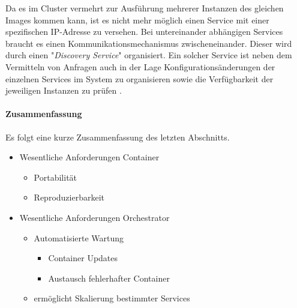 Da es im Cluster vermehrt zur Ausführung mehrerer Instanzen des gleichen Images kommen kann, ist es nicht mehr möglich einen Service mit einer spezifischen IP-Adresse zu versehen. Bei untereinander abhängigen Services braucht es einen Kommunikationsmechanismus zwischeneinander. Dieser wird durch einen "\emph{Discovery Service}" organisiert. Ein solcher Service ist neben dem Vermitteln von Anfragen auch in der Lage Konfigurationsänderungen der einzelnen Services im System zu organisieren sowie die Verfügbarkeit der jeweiligen Instanzen zu prüfen \cite[Seite~45 ff.]{soppelsaswarm}.

\paragraph{Zusammenfassung}

Es folgt eine kurze Zusammenfassung des letzten Abschnitts.

\begin{itemize}
  \item Wesentliche Anforderungen Container
  \begin{itemize}
    \item Portabilität
    \item Reproduzierbarkeit
  \end{itemize}
  \item Wesentliche Anforderungen Orchestrator
  \begin{itemize}
    \item Automatisierte Wartung 
    \begin{itemize}
      \item Container Updates
      \item Austausch fehlerhafter Container
    \end{itemize}
    \item ermöglicht Skalierung bestimmter Services
  \end{itemize}
\end{itemize}


